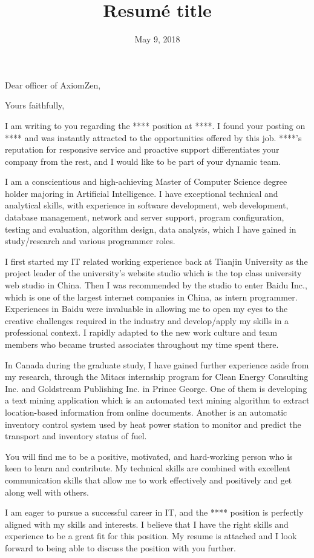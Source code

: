 \documentclass[11pt,a4paper,sans]{moderncv}        %
\title{Resumé title}                               %
\begin{document}
\date{May 9, 2018}
\opening{Dear officer of AxiomZen,}
\closing{Yours faithfully,}
\makelettertitle

I am writing to you regarding the **** position at ****. I found your posting on **** and was instantly attracted to the opportunities offered by this job. ****'s reputation for responsive service and proactive support differentiates your company from the rest, and I would like to be part of your dynamic team.

I am a conscientious and high-achieving Master of Computer Science degree holder majoring in Artificial Intelligence. I have exceptional technical and analytical skills, with experience in software development, web development, database management, network and server support, program configuration, testing and evaluation, algorithm design, data analysis, which I have gained in study/research and various programmer roles. 

I first started my IT related working experience back at Tianjin University as the project leader of the university's website studio which is the top class university web studio in China. Then I was recommended by the studio to enter Baidu Inc., which is one of the largest internet companies in China, as intern programmer. Experiences in Baidu were invaluable in allowing me to open my eyes to the creative challenges required in the industry and develop/apply my skills in a professional context. I rapidly adapted to the new work culture and team members who became trusted associates throughout my time spent there.

In Canada during the graduate study, I have gained further experience aside from my research, through the Mitacs internship program for Clean Energy Consulting Inc. and Goldstream Publishing Inc. in Prince George. One of them is developing a text mining application which is an automated text mining algorithm to extract location-based information from online documents. Another is an automatic inventory control system used by heat power station to monitor and predict the transport and inventory status of fuel.

You will find me to be a positive, motivated, and hard-working person who is keen to learn and contribute. My technical skills are combined with excellent communication skills that allow me to work effectively and positively and get along well with others.

I am eager to pursue a successful career in IT, and the **** position is perfectly aligned with my skills and interests. I believe that I have the right skills and experience to be a great fit for this position. My resume is attached and I look forward to being able to discuss the position with you further.


\makeletterclosing
\end{document}
